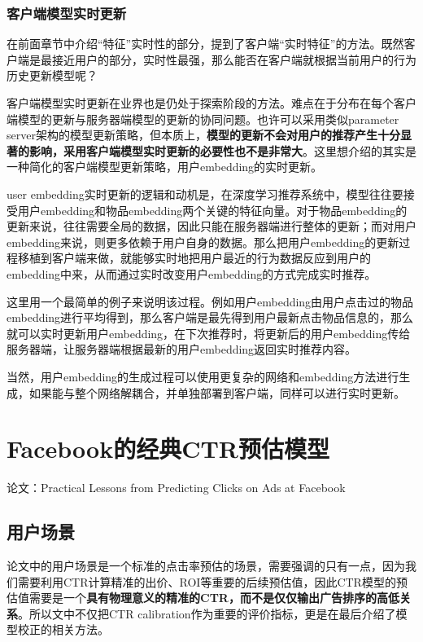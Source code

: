 \documentclass[12pt]{article}
\begin{document}
\subsubsection{客户端模型实时更新}
在前面章节中介绍“特征”实时性的部分，提到了客户端“实时特征”的方法。既然客户端是最接近用户的部分，实时性最强，那么能否在客户端就根据当前用户的行为历史更新模型呢？

客户端模型实时更新在业界也是仍处于探索阶段的方法。难点在于分布在每个客户端模型的更新与服务器端模型的更新的协同问题。也许可以采用类似parameter server架构的模型更新策略，但本质上，\textbf{模型的更新不会对用户的推荐产生十分显著的影响，采用客户端模型实时更新的必要性也不是非常大}。这里想介绍的其实是一种简化的客户端模型更新策略，用户embedding的实时更新。

user embedding实时更新的逻辑和动机是，在深度学习推荐系统中，模型往往要接受用户embedding和物品embedding两个关键的特征向量。对于物品embedding的更新来说，往往需要全局的数据，因此只能在服务器端进行整体的更新；而对用户embedding来说，则更多依赖于用户自身的数据。那么把用户embedding的更新过程移植到客户端来做，就能够实时地把用户最近的行为数据反应到用户的embedding中来，从而通过实时改变用户embedding的方式完成实时推荐。

这里用一个最简单的例子来说明该过程。例如用户embedding由用户点击过的物品embedding进行平均得到，那么客户端是最先得到用户最新点击物品信息的，那么就可以实时更新用户embedding，在下次推荐时，将更新后的用户embedding传给服务器端，让服务器端根据最新的用户embedding返回实时推荐内容。

当然，用户embedding的生成过程可以使用更复杂的网络和embedding方法进行生成，如果能与整个网络解耦合，并单独部署到客户端，同样可以进行实时更新。

\section{Facebook的经典CTR预估模型}
论文：Practical Lessons from Predicting Clicks on Ads at Facebook

\subsection{用户场景}
论文中的用户场景是一个标准的点击率预估的场景，需要强调的只有一点，因为我们需要利用CTR计算精准的出价、ROI等重要的后续预估值，因此CTR模型的预估值需要是一个\textbf{具有物理意义的精准的CTR，而不是仅仅输出广告排序的高低关系}。所以文中不仅把CTR calibration作为重要的评价指标，更是在最后介绍了模型校正的相关方法。
\end{document}
